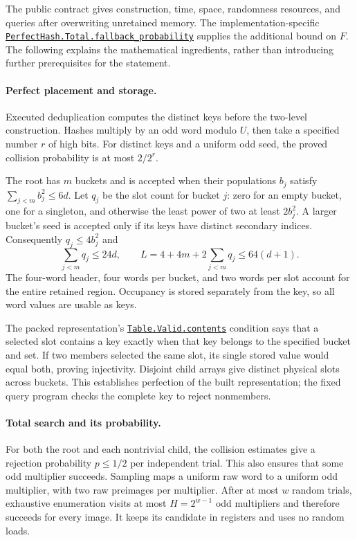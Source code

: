 \documentclass[11pt,a4paper]{article}
\theoremstyle{definition}
\newcommand{\code}[1]{\nolinkurl{#1}}
\newcommand{\src}[3]{\href{https://github.com/ilyaraz/verified_algorithms/blob/f67e943886482e132334af0f922f24dd58bb4cdc/#1\#L#2}{#3}}
\begin{document}
The public contract gives construction, time, space, randomness resources,
and queries after overwriting unretained memory. The implementation-specific
\src{DataStructures/PerfectHash/Total/FallbackProbability.lean}{75}{\code{PerfectHash.Total.fallback_probability}} supplies the additional
bound on $F$. The following explains the mathematical ingredients, rather
than introducing further prerequisites for the statement.

\paragraph{Perfect placement and storage.}
Executed deduplication computes the distinct keys before the two-level
construction. Hashes multiply by an odd word modulo $U$, then take a
specified number $r$ of high bits. For distinct keys and a uniform odd seed,
the proved collision probability is at most $2/2^r$.

The root has $m$ buckets and is accepted when their populations $b_j$
satisfy $\sum_{j<m}b_j^2\le6d$. Let $q_j$ be the slot count for bucket $j$:
zero for an empty bucket, one for a singleton, and otherwise the least
power of two at least $2b_j^2$. A larger bucket's seed is accepted only if its keys have
distinct secondary indices. Consequently $q_j\le4b_j^2$ and
\[
 \sum_{j<m}q_j\le24d,\qquad
 L=4+4m+2\sum_{j<m}q_j\le64(d+1).
\]
The four-word header, four words per bucket, and two words per slot account
for the entire retained region. Occupancy is stored separately from the key,
so all word values are usable as keys.

The packed representation's \src{DataStructures/PerfectHash/Representation.lean}{35}{\code{Table.Valid.contents}} condition says that
a selected slot contains a key exactly when that key belongs to the specified
bucket and set. If two members selected the same slot, its single stored
value would equal both, proving injectivity. Disjoint child arrays give
distinct physical slots across buckets. This establishes perfection of the
built representation; the fixed query program checks the complete key to
reject nonmembers.

\paragraph{Total search and its probability.}
For both the root and each nontrivial child, the collision estimates give
a rejection probability $p\le1/2$ per independent trial. This also ensures
that some odd multiplier succeeds. Sampling maps a uniform raw word to a
uniform odd multiplier, with two raw preimages per multiplier.
After at most $w$ random trials, exhaustive enumeration visits at most
$H=2^{w-1}$ odd multipliers and therefore succeeds for every image.
It keeps its candidate in registers and uses no random loads.
\end{document}
